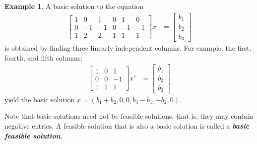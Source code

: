 \documentclass[a4paper, 12pt]{article}
\numberwithin{equation}{section}
\numberwithin{figure}{section}
\theoremstyle{definition}
\newtheorem{ex}[thm]{Example}
\newcommand{\define}[1]{\textbf{\textit{#1}}}
\begin{document}
\begin{ex}
	A basic solution to the equation 
	\begin{align*}
		\begin{bmatrix}
			1 & 0 & 1 & 0 & 1 & 0 \\ 
			0 & -1 & -1 & 0 & -1 & -1 \\
			1 & 2 & 2 & 1 & 1 & 1 
		\end{bmatrix} x &= \begin{bmatrix}
			b_1 \\ b_2 \\ b_3
		\end{bmatrix}
	\end{align*}
	is obtained by finding three linearly independent columns. For example, the
	first, fourth, and fifth columns:
	\begin{align*}
		\begin{bmatrix}
			1 & 0 & 1 \\ 
			0 & 0 & -1 \\
			1 & 1 & 1 
		\end{bmatrix} x' &= \begin{bmatrix}
			b_1 \\ b_2 \\ b_3
		\end{bmatrix}
	\end{align*}
	yield the basic solution $x=(b_1+b_2, 0, 0, b_3-b_1, -b_2, 0)$.
\end{ex}

Note that basic solutions need not be feasible solutions, that is, they may
contain negative entries. A feasible solution that is also a basic solution is
called a \define{basic feasible solution}.
\end{document}
